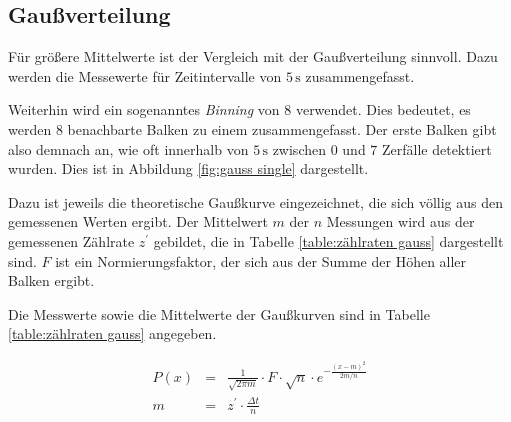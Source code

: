 \documentclass[12pt,a4paper]{scrartcl}
\numberwithin{equation}{section} %
\begin{document}
\hypertarget{gauuxdfverteilung}{%
\subsection{Gaußverteilung}\label{gauuxdfverteilung}}
Für größere Mittelwerte ist der Vergleich mit der Gaußverteilung sinnvoll. Dazu werden die Messewerte für Zeitintervalle von $5 \mathrm{\,s}$ zusammengefasst.

Weiterhin wird ein sogenanntes \textit{Binning} von $8$ verwendet. Dies bedeutet, es werden $8$ benachbarte Balken zu einem zusammengefasst. Der erste Balken gibt also demnach an, wie oft innerhalb von $5 \mathrm{\, s}$ zwischen $0$ und $7$ Zerfälle detektiert wurden. Dies ist in Abbildung \ref{fig:gauss single} dargestellt.

Dazu ist jeweils die theoretische Gaußkurve eingezeichnet, die sich völlig aus den gemessenen Werten ergibt. Der Mittelwert $m$ der $n$ Messungen wird aus der gemessenen Zählrate $z^\prime$ gebildet, die in Tabelle \ref{table:zählraten gauss} dargestellt sind. $F$ ist ein Normierungsfaktor, der sich aus der Summe der Höhen aller Balken ergibt.

Die Messwerte sowie die Mittelwerte der Gaußkurven sind in Tabelle \ref{table:zählraten gauss} angegeben.

\begin{eqnarray}
	P(x) &=& \frac{1}{\sqrt{2 \pi m}} \cdot F \cdot \sqrt{n} \cdot e^{- \frac{(x-m)^2}{2m/n}} \\
	m &=& z^\prime \cdot \frac{\Delta t}{n}
\end{eqnarray}
\end{document}
